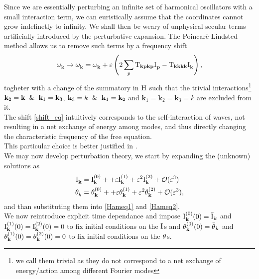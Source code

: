 Since we are essentially perturbing an infinite set of harmonical oscillators with a small interaction term, we can euristically assume that
the coordinates cannot grow indefinetly to infinity. We shall then be weary of unphysical secular terms artificially introduced by the perturbative
expansion. The Poincarè-Lindsted method allows us to remove such terms by a frequency shift
\begin{equation}
    \omega^{}_{\mathbf{k}} \rightarrow \omega^{}_{\mathbf{k}} = \omega^{}_{\mathbf{k}} + \varepsilon \left(2\sum_p \mathrm{T}_{\mathbf{kpkp}}\mathrm{I}^{}_\mathbf{p} - 
    \mathrm{T}_{\mathbf{kkkk}}\mathrm{I}^{}_\mathbf{k} \right),
    \label{shift_eq}
\end{equation}   
togheter with a change of the summatory in $\mathrm{H}$ such that the trivial interactions\footnote{
    we call them trivial as they do not correspond to a net exchange of energy/action among different Fourier modes
} $\mathbf{k}_2=\mathbf{k} \hspace{2mm}\&\hspace{2mm} \mathbf{k}_1 = \mathbf{k}_3$, $\mathbf{k}_3=k \hspace{2mm}\& \hspace{2mm}\mathbf{k}_1=\mathbf{k}_2$ and $\mathbf{k}_1=\mathbf{k}_2=\mathbf{k}_3=k$ are excluded from it. \\
The shift \eqref{shift_eq} intuitively corresponds to the self-interaction of waves, not resulting in a net exchange of energy among modes, and thus directly changing 
the characteristic frequency of the free equation. \\ 
This particular choice is better justified in \cite{Nazarenko2011}. \\

We may now develop perturbation theory, we start by expanding the (unknown) solutions as
\begin{align}
    \mathrm{I}^{}_\mathbf{k} &= \mathrm{I}^{(0)}_\mathbf{k} +  + \varepsilon \mathrm{I}^{(1)}_\mathbf{k} + \varepsilon^2 \mathrm{I}^{(2)}_\mathbf{k} + \mathcal{O}(\varepsilon^3) \\
    \theta^{}_k &= \theta^{(0)}_\mathbf{k} +  + \varepsilon \theta^{(1)}_\mathbf{k} + \varepsilon^2 \theta^{(2)}_\mathbf{k} + \mathcal{O}(\varepsilon^3),
\end{align}
and than substituting them into \eqref{Hameq1} and \eqref{Hameq2}. \\
We now reintroduce explicit time dependance and impose $\mathrm{I}^{(0)}_\mathbf{k}(0) = \bar{\mathrm{I}^{}}_k$ and $\mathrm{I}^{(1)}_\mathbf{k}(0) = \mathrm{I}^{(2)}_\mathbf{k}(0) = 0$ to fix initial conditions on the $\mathrm{I}^{}$s and 
$\theta^{(0)}_\mathbf{k}(0) = \bar{\theta^{}}_k$ and $\theta^{(1)}_\mathbf{k}(0) = \theta^{(2)}_\mathbf{k}(0) = 0$ to fix initial conditions on the $\theta^{}$s.\\

